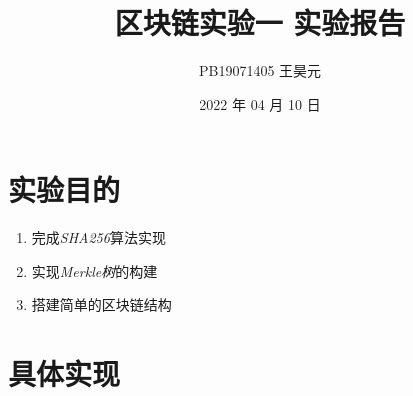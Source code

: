 \documentclass{article}
\title{区块链实验一 实验报告}
\author{PB19071405 王昊元}
\date{2022 年 04 月 10 日}
\begin{document}
\maketitle

\section{实验目的}

\begin{enumerate}
    \item 完成\emph{SHA256}算法实现
    \item 实现\emph{Merkle树}的构建
    \item 搭建简单的区块链结构
\end{enumerate}

\section{具体实现}
\end{document}
